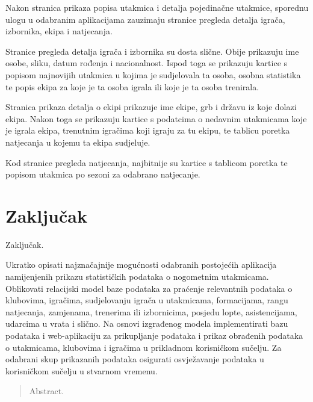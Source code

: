 \documentclass[times, utf8, zavrsni]{fer}
\begin{document}
Nakon stranica prikaza popisa utakmica i detalja pojedinačne utakmice, sporednu ulogu u odabranim aplikacijama zauzimaju stranice pregleda detalja igrača, izbornika, ekipa i natjecanja.

Stranice pregleda detalja igrača i izbornika su dosta slične. Obije prikazuju ime osobe, sliku, datum rođenja i nacionalnost.
Ispod toga se prikazuju kartice s popisom najnovijih utakmica u kojima je sudjelovala ta osoba, osobna statistika te popis ekipa za koje je ta osoba igrala ili koje je ta osoba trenirala.

Stranica prikaza detalja o ekipi prikazuje ime ekipe, grb i državu iz koje dolazi ekipa. Nakon toga se prikazuju kartice s podatcima o nedavnim utakmicama koje je igrala ekipa,
trenutnim igračima koji igraju za tu ekipu, te tablicu poretka natjecanja u kojemu ta ekipa sudjeluje.

Kod stranice pregleda natjecanja, najbitnije su kartice s tablicom poretka te popisom utakmica po sezoni za odabrano natjecanje.

\chapter{Zaključak}
Zaključak.




\begin{sazetak}
Ukratko opisati najznačajnije mogućnosti odabranih postojećih aplikacija namijenjenih prikazu statističkih
podataka o nogometnim utakmicama. Oblikovati relacijski model baze podataka za praćenje relevantnih
podataka o klubovima, igračima, sudjelovanju igrača u utakmicama, formacijama, rangu natjecanja,
zamjenama, trenerima ili izbornicima, posjedu lopte, asistencijama, udarcima u vrata i slično. Na osnovi
izgrađenog modela implementirati bazu podataka i web-aplikaciju za prikupljanje podataka i prikaz obrađenih
podataka o utakmicama, klubovima i igračima u prikladnom korisničkom sučelju. Za odabrani skup prikazanih
podataka osigurati osvježavanje podataka u korisničkom sučelju u stvarnom vremenu.

\end{sazetak}

\begin{abstract}
Abstract.

\end{abstract}
\end{document}
